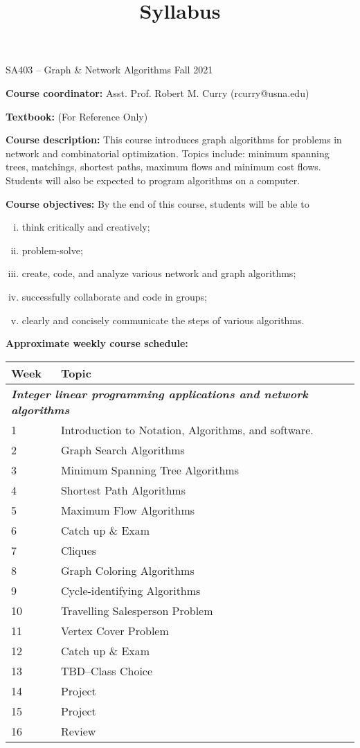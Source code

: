 \documentclass[12pt]{article}
\makeatletter
\theoremstyle{definition}
\newcommand{\graphbox}[5]%
{
\begin{tikzpicture}
     [>=latex,scale=#5]
     
     \draw [->,very thick] (#1, 0) -- (#2, 0) node[right] {$x$};
     \draw [->,very thick] (0, #3) -- (0, #4) node[above] {$y$};
     
     \draw[step=1cm,thick,dotted] (#1,#3) grid (#2,#4);
   \end{tikzpicture}
   }
\renewcommand{\maketitle}{
  \noindent SA403 -- Graph \& Network Algorithms \hfill Fall 2021

  \begin{center}\large{\textbf{\@title}}\end{center}
}
\makeatother
\begin{document}

\title{Syllabus}


\maketitle

\noindent \textbf{Course coordinator:}  Asst. Prof. Robert M. Curry  (rcurry@usna.edu)

\noindent \textbf{Textbook:} (For Reference Only)

\noindent \textbf{Course description: } This course introduces graph algorithms for problems in network and combinatorial optimization. Topics include: minimum spanning trees, matchings, shortest paths, maximum flows and minimum cost flows. Students will also be expected to program algorithms on a computer.

\noindent \textbf{Course objectives:}  By the end of this course, students will be able to
\vspace{-2mm}
\begin{enumerate}[(i)]
	\item think critically and creatively;
	\item problem-solve;
	\item create, code, and analyze various network and graph algorithms;
	\item successfully collaborate and code in groups;
	\item clearly and concisely communicate the steps of various algorithms.
\end{enumerate}
\noindent \textbf{Approximate weekly course schedule:} 

\renewcommand\arraystretch{1.5}
\begin{longtable}{ll}
Week \hspace{.2in} & Topic \\
\hline 
\multicolumn{2}{l}{\textbf{\textit{Integer linear programming applications and network algorithms}}}\\
1 & Introduction to Notation, Algorithms, and software.  \\
2 & Graph Search Algorithms \\
3 & Minimum Spanning Tree Algorithms\\ 
4 & Shortest Path Algorithms \\
5 & Maximum Flow Algorithms\\
6 & Catch up \& Exam \\
7 & Cliques \\
8 & Graph Coloring Algorithms \\
9 & Cycle-identifying Algorithms\\
10 & Travelling Salesperson Problem\\
11 &  Vertex Cover Problem\\
12 & Catch up \& Exam \\
13 & TBD--Class Choice\\
14 & Project \\
15 & Project \\
16 &  Review \\
\end{longtable}
\end{document}

